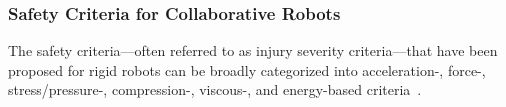 \subsubsection{Safety Criteria for Collaborative Robots}

The safety criteria—often referred to as injury severity criteria—that have been proposed for rigid robots can be broadly categorized into acceleration-, force-, stress/pressure-, compression-, viscous-, and energy-based criteria~\citep{haddadin2009requirements, haddadin2013towards}.

